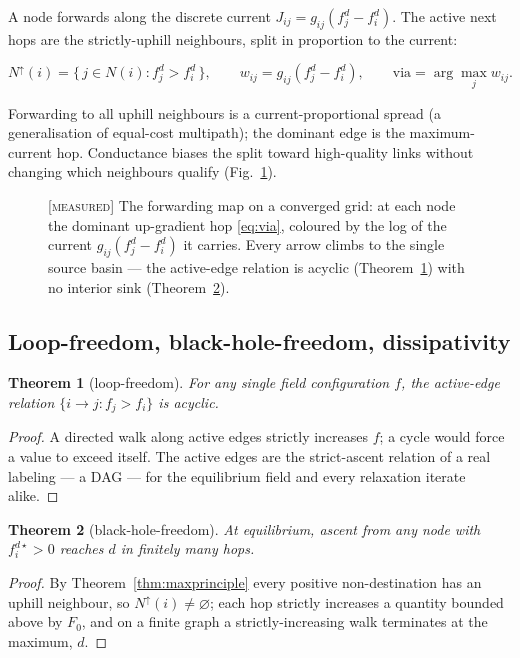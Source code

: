 \documentclass[11pt]{article}
\theoremstyle{plain}
\newtheorem{theorem}{Theorem}[section]
\numberwithin{equation}{section}
\begin{document}
A node forwards along the discrete current $J_{ij}=g_{ij}(f^d_j-f^d_i)$. The active next hops are the strictly-uphill neighbours, split in proportion to the current:

\begin{equation}\label{eq:via}
N^{\uparrow}(i)=\{\,j\in N(i):f^d_j>f^d_i\,\},\qquad w_{ij}=g_{ij}(f^d_j-f^d_i),\qquad \text{via}=\arg\max_j w_{ij}.
\end{equation}

Forwarding to all uphill neighbours is a current-proportional spread (a generalisation of equal-cost multipath); the dominant edge is the maximum-current hop. Conductance biases the split toward high-quality links without changing which neighbours qualify (Fig.~\ref{fig:gridflow}).

\begin{figure}[tbp]
\centering

\caption{\textsc{[measured]} The forwarding map on a converged grid: at each node the dominant up-gradient hop \eqref{eq:via}, coloured by the log of the current $g_{ij}(f^d_j-f^d_i)$ it carries. Every arrow climbs to the single source basin — the active-edge relation is acyclic (Theorem~\ref{thm:loopfree}) with no interior sink (Theorem~\ref{thm:blackhole}).}
\label{fig:gridflow}
\end{figure}

\subsection{Loop-freedom, black-hole-freedom, dissipativity}\label{sec:loop-free}

\begin{theorem}[loop-freedom]\label{thm:loopfree}
For any single field configuration $f$, the active-edge relation $\{i\to j:f_j>f_i\}$ is acyclic.
\end{theorem}
\begin{proof}
A directed walk along active edges strictly increases $f$; a cycle would force a value to exceed itself. The active edges are the strict-ascent relation of a real labeling — a DAG — for the equilibrium field and every relaxation iterate alike.
\end{proof}

\begin{theorem}[black-hole-freedom]\label{thm:blackhole}
At equilibrium, ascent from any node with $f^{d\star}_i>0$ reaches $d$ in finitely many hops.
\end{theorem}
\begin{proof}
By Theorem~\ref{thm:maxprinciple} every positive non-destination has an uphill neighbour, so $N^{\uparrow}(i)\neq \varnothing$; each hop strictly increases a quantity bounded above by $F_0$, and on a finite graph a strictly-increasing walk terminates at the maximum, $d$.
\end{proof}
\end{document}

